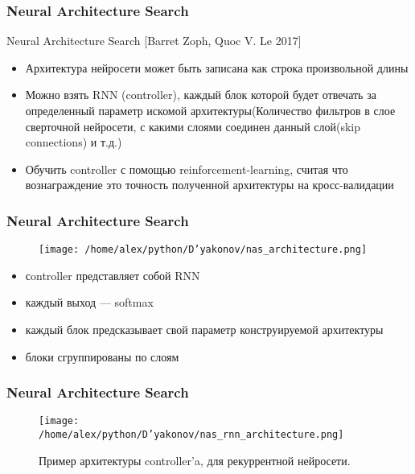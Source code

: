 \documentclass[fleqn, xcolor=x11names]{beamer}
\begin{document}
\begin{frame}[fragile]\frametitle{Neural Architecture Search}

\begin{block}{Neural Architecture Search [Barret Zoph, Quoc V. Le 2017]}

\begin{itemize}
\item Архитектура нейросети может быть записана как строка произвольной длины

\item Можно взять RNN (controller), каждый блок которой будет отвечать за определенный параметр искомой архитектуры(Количество фильтров в слое сверточной нейросети, с какими слоями соединен данный слой(skip connections) и т.д.)

\item Обучить controller с помощью reinforcement-learning, считая что вознаграждение это точность полученной архитектуры на кросс-валидации
\end{itemize}

\end{block}


\end{frame}

\begin{frame}\frametitle{Neural Architecture Search}

\begin{figure}[h]
\begin{center}
\texttt{[image: /home/alex/python/D'yakonov/nas\_architecture.png]}
\end{center}
\end{figure}
{\footnotesize
\begin{itemize}
\item сontroller представляет собой RNN
\item каждый выход --- softmax
\item каждый блок предсказывает свой параметр конструируемой архитектуры
\item блоки сгруппированы по слоям
\end{itemize}
}
\end{frame}

\begin{frame}\frametitle{Neural Architecture Search}



\begin{figure}[h]
\begin{center}
\texttt{[image: /home/alex/python/D'yakonov/nas\_rnn\_architecture.png]}
{\footnotesize
\caption{Пример архитектуры controller'a, для рекуррентной нейросети.}
}
\end{center}
\end{figure}


\end{frame}
\end{document}
